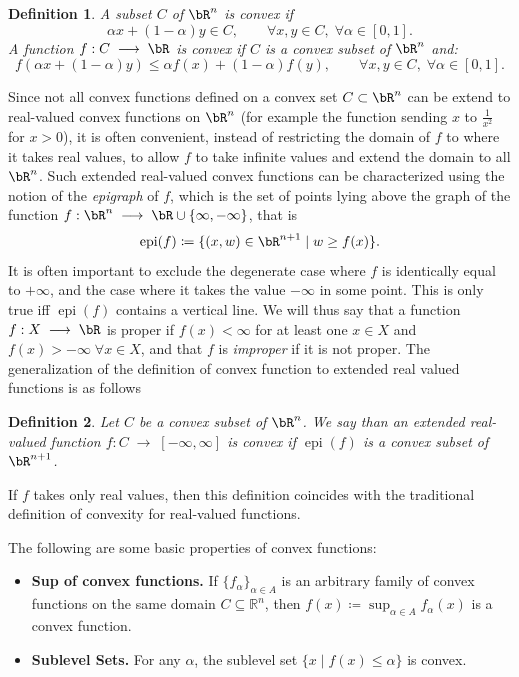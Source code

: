 \documentclass[11pt,a4paper,oneside,openany]{book}
\DeclareMathOperator{\epi}{epi}
\newtheorem{definition}{Definition}
\numberwithin{definition}{section}
\numberwithin{theorem}{section}
\numberwithin{problem}{section}
\newcommand{\la}{\; \longrightarrow \;}
\begin{document}
\begin{definition}
    A subset $C$ of $\bR^n$ is \emph{convex} if 
    \begin{equation*}
        \alpha x + (1 -\alpha) y \in C, \qquad  \forall x,y \in C, \; \forall \alpha \in [0,1].
    \end{equation*}
    A function $f:C \la \bR$ is convex if $C$ is a convex subset of $\bR^n$ and: \begin{equation*}
        f(\alpha x + (1- \alpha) y) \leq \alpha f(x) + (1-\alpha) f(y), \qquad \forall x,y \in C,\; \forall \alpha \in [0,1].
    \end{equation*}
\end{definition}

Since not all convex functions defined on a convex set $C \subset \bR^n$ can be extend to real-valued convex functions on $\bR^n$ (for example the function sending \(x\) to \(\frac{1}{x^2}\) for $x > 0$), it is often convenient, instead of restricting the domain of $f$ to where it takes real values, to allow $f$ to take infinite values and extend the domain to all \(\bR^n\). Such extended real-valued convex functions can be characterized using the notion of the \emph{epigraph} of $f$, which is the set of points lying above the graph of the function $f: \bR^n\la \bR \cup \{\infty, -\infty\}$, that is
\begin{equation}
    \epi(f) \coloneqq \{(x,w) \in \bR^{n+1} \mid w \geq f(x)\}.
\end{equation} It is often important to exclude the degenerate case where $f$ is identically equal to $+\infty$, and the case where it takes the value $-\infty$ in some point. This is only true iff $\epi(f)$ contains a vertical line. We will thus say that a function $f:X \la \bR$ is proper if \(f(x) < \infty\) for at least one $x \in X$ and $f(x) > -\infty \; \forall x \in X$, and that \(f\) is \emph{improper} if it is not proper. The generalization of the definition of convex function to extended real valued functions is as follows
\begin{definition}
    Let $C$ be a convex subset of $\bR^n$. We say than an extended real-valued function $f:C \la [-\infty, \infty]$ is \emph{convex} if \(\epi(f)\) is a convex subset of $\bR^{n+1}$.
\end{definition}
If \(f\) takes only real values, then this definition coincides with the traditional definition of convexity for real-valued functions.



The following are some basic properties of convex functions:
\begin{itemize}
    \item \textbf{Sup of convex functions.} If $\{f_{\alpha}\}_{\alpha \in A}$ is an arbitrary family of convex functions on the same domain \( C \subseteq \mathbb{R}^n \), then \( f(x) \coloneqq \sup_{\alpha \in A} f_{\alpha}(x) \) is a convex function.

    \item \textbf{Sublevel Sets.} For any \( \alpha \), the sublevel set \( \{ x \mid f(x) \leq \alpha \} \) is convex.
\end{itemize}
\end{document}
